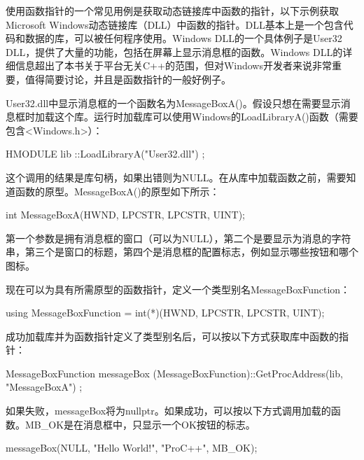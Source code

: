 
使用函数指针的一个常见用例是获取动态链接库中函数的指针，以下示例获取Microsoft Windows动态链接库（DLL）中函数的指针。DLL基本上是一个包含代码和数据的库，可以被任何程序使用。Windows DLL的一个具体例子是User32 DLL，提供了大量的功能，包括在屏幕上显示消息框的函数。Windows DLL的详细信息超出了本书关于平台无关C++的范围，但对Windows开发者来说非常重要，值得简要讨论，并且是函数指针的一般好例子。

User32.dll中显示消息框的一个函数名为MessageBoxA()。假设只想在需要显示消息框时加载这个库。运行时加载库可以使用Windows的LoadLibraryA()函数（需要包含<Windows.h>）：

\begin{cpp}
HMODULE lib { ::LoadLibraryA("User32.dll") };
\end{cpp}

这个调用的结果是库句柄，如果出错则为NULL。在从库中加载函数之前，需要知道函数的原型。MessageBoxA()的原型如下所示：

\begin{cpp}
int MessageBoxA(HWND, LPCSTR, LPCSTR, UINT);
\end{cpp}

第一个参数是拥有消息框的窗口（可以为NULL），第二个是要显示为消息的字符串，第三个是窗口的标题，第四个是消息框的配置标志，例如显示哪些按钮和哪个图标。

现在可以为具有所需原型的函数指针，定义一个类型别名MessageBoxFunction：

\begin{cpp}
using MessageBoxFunction = int(*)(HWND, LPCSTR, LPCSTR, UINT);
\end{cpp}

成功加载库并为函数指针定义了类型别名后，可以按以下方式获取库中函数的指针：

\begin{cpp}
MessageBoxFunction messageBox {
    (MessageBoxFunction)::GetProcAddress(lib, "MessageBoxA") };
\end{cpp}

如果失败，messageBox将为nullptr。如果成功，可以按以下方式调用加载的函数。MB\_OK是在消息框中，只显示一个OK按钮的标志。

\begin{cpp}
messageBox(NULL, "Hello World!", "ProC++", MB_OK);
\end{cpp}











